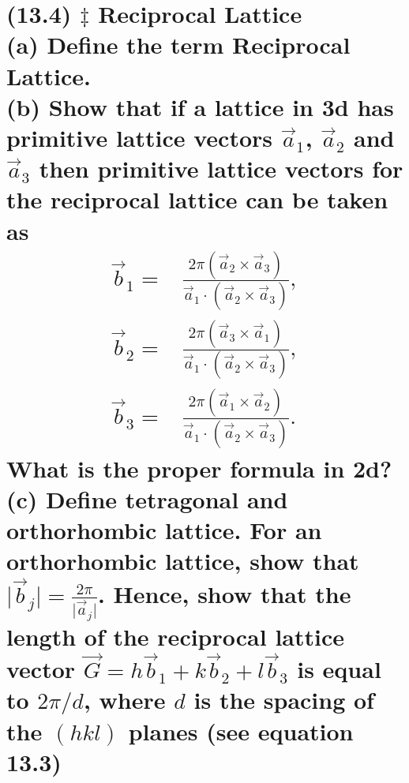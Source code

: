 \documentclass[reqno,a4paper,12pt]{amsart}
\begin{document}
\section{\textbf{(13.4) $\ddagger$ Reciprocal Lattice} \\
(a) Define the term Reciprocal Lattice. \\
(b) Show that if a lattice in 3d has primitive lattice vectors $\vec{a}_1$, $\vec{a}_2$ and $\vec{a}_3$ then primitive lattice vectors for the reciprocal lattice can be taken as 
\begin{align*}
	\vec{b}_1 =& \frac{2\pi (\vec{a}_2 \times \vec{a}_3)}{\vec{a}_1\cdot (\vec{a}_2\times\vec{a}_3)}, \\
	\vec{b}_2 =& \frac{2\pi (\vec{a}_3 \times \vec{a}_1)}{\vec{a}_1\cdot (\vec{a}_2\times\vec{a}_3)}, \\
	\vec{b}_3 =& \frac{2\pi (\vec{a}_1 \times \vec{a}_2)}{\vec{a}_1\cdot (\vec{a}_2\times\vec{a}_3)}. 
\end{align*}
What is the proper formula in 2d? \\
(c) Define tetragonal and orthorhombic lattice. For an orthorhombic lattice, show that $\vert \vec{b}_j \vert = \frac{2\pi}{\vert \vec{a}_j \vert}$. Hence, show that the length of the reciprocal lattice vector $\vec{G} = h\vec{b}_1 + k\vec{b}_2 + l\vec{b}_3$ is equal to $2\pi/d$, where $d$ is the spacing of the $(hkl)$ planes (see equation 13.3)
}
\end{document}
